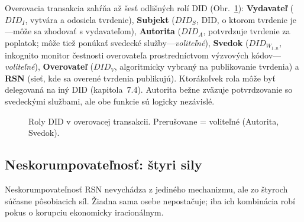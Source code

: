\documentclass[11pt,a4paper,twocolumn]{article}
\begin{document}
Overovacia transakcia zahŕňa až šesť odlišných rolí DID (Obr.~\ref{fig:roles}): \textbf{Vydavateľ} ($DID_I$, vytvára a odosiela tvrdenie), \textbf{Subjekt} ($DID_S$, DID, o ktorom tvrdenie je---môže sa zhodovať s vydavateľom), \textbf{Autorita} ($DID_A$, potvrdzuje tvrdenie za poplatok; môže tiež ponúkať svedecké služby---\emph{voliteľné}), \textbf{Svedok} ($DID_{W_{1..n}}$, inkognito monitor čestnosti overovateľa prostredníctvom výzvových kódov---\emph{voliteľné}), \textbf{Overovateľ} ($DID_V$, algoritmicky vybraný na publikovanie tvrdenia) a \textbf{RSN} (sieť, kde sa overené tvrdenia publikujú). Ktorákoľvek rola môže byť delegovaná na iný DID (kapitola~7.4). Autorita bežne zväzuje potvrdzovanie so svedeckými službami, ale obe funkcie sú logicky nezávislé.

\begin{figure}[ht]
\centering
{}
\caption{Roly DID v overovacej transakcii. Prerušovane = voliteľné (Autorita, Svedok).}
\label{fig:roles}
\end{figure}

\subsection{Neskorumpovateľnosť: štyri sily}

Neskorumpovateľnosť RSN nevychádza z jediného mechanizmu, ale zo štyroch súčasne pôsobiacich síl. Žiadna sama osebe nepostačuje; iba ich kombinácia robí pokus o korupciu ekonomicky iracionálnym.
\end{document}
